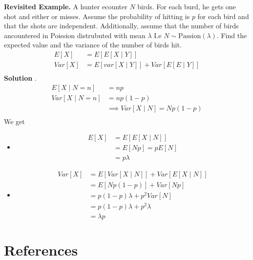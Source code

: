 \documentclass{article}
\theoremstyle{remark}
\begin{document}
   \begin{tcolorbox}
     \textbf{Revisited Example.} A hunter ecounter $N$ birds. For each burd, he gets one shot and either or misses. Assume the probability of hitting is $p$ for each bird and that the shots are independent. Additionally, assume that the number of birds ancountered in Poission distrubuted with mean $\lambda$ I.e $N \sim \text{Passion}\left( \lambda  \right)$. Find the expected value and the variance of the number of birds hit. \[
    \begin{split}
      E\left[ X \right] &=  E \left[ E\left[ X  \mid  Y \right] \right] \\
      Var \left[ X \right]   & =  E\left[ var\left[ X  \mid Y \right] \right] + Var \left[ E\left[ E  \mid Y \right] \right]  \\
    \end{split}  
     \] 
     \textbf{Solution} .
   \[
       \begin{split}
       E\left[ X  \mid N =n  \right] &=  np \\
   Var\left[ X  \mid  N =n \right]   &  =  np\left( 1-p \right) \\
   &\implies  Var\left[ X  \mid  N \right] = N p\left( 1-p \right) \\
       \end{split} 
   \] 
   We get 
   \begin{itemize}
     \item \[
         \begin{split}
     E\left[ X \right] &=  E\left[ E\left[ X  \mid  N \right] \right] \\
     &=  E\left[ Np \right] = p E\left[ N \right] \\
     &=  p \lambda    
         \end{split} 
     \] 
   \item \[
       \begin{split}
   Var\left[ X \right]  & = E\left[ Var\left[ X  \mid N \right] \right] +  Var \left[ E\left[ X  \mid N \right] \right] \\
   &=  E \left[ Np\left( 1-p \right) \right] +  Var\left[ Np \right] \\
   &=  p\left( 1-p \right) \lambda + p^2 Var\left[ N \right] \\
   &=  p\left( 1-p \right) \lambda + p^2 \lambda   \\
   &=  \lambda p    
       \end{split} 
   \] 
     \end{itemize}

   \end{tcolorbox}
   


\newpage

\section{References}%
\label{sec:references}





\end{document}
